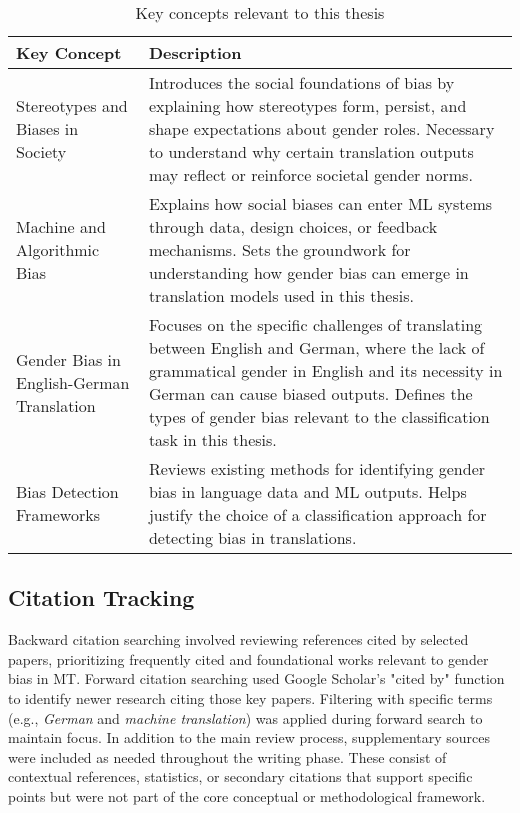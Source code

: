 \renewcommand{\arraystretch}{1.3}
\begin{table}[ht!]
\centering
\begin{tabularx}{\textwidth}{lX}
\toprule
\textbf{Key Concept} & \textbf{Description} \\
\midrule
Stereotypes and Biases in Society & Introduces the social foundations of bias by explaining how stereotypes form, persist, and shape expectations about gender roles. Necessary to understand why certain translation outputs may reflect or reinforce societal gender norms. \\

Machine and Algorithmic Bias & Explains how social biases can enter ML systems through data, design choices, or feedback mechanisms. Sets the groundwork for understanding how gender bias can emerge in translation models used in this thesis. \\

Gender Bias in English-German Translation & Focuses on the specific challenges of translating between English and German, where the lack of grammatical gender in English and its necessity in German can cause biased outputs. Defines the types of gender bias relevant to the classification task in this thesis. \\

Bias Detection Frameworks & Reviews existing methods for identifying gender bias in language data and ML outputs. Helps justify the choice of a classification approach for detecting bias in translations. \\

\bottomrule
\end{tabularx}
\caption{Key concepts relevant to this thesis}
\label{tab:key-concepts}
\end{table}

\subsection{Citation Tracking}
Backward citation searching involved reviewing references cited by selected papers, prioritizing frequently cited and foundational works relevant to gender bias in MT. Forward citation searching used Google Scholar's "cited by" function to identify newer research citing those key papers. Filtering with specific terms (e.g., \textit{German} and \textit{machine translation}) was applied during forward search to maintain focus. In addition to the main review process, supplementary sources were included as needed throughout the writing phase. These consist of contextual references, statistics, or secondary citations that support specific points but were not part of the core conceptual or methodological framework.

